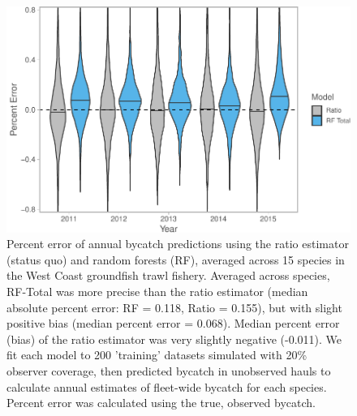\documentclass[]{article}
\begin{document}
\begin{figure}

{\centering \includegraphics[width=6in]{bycatch_sim_paper_sepsupp_ices_files/figure-latex/model-comparison-byyear-1} 

}

\caption{Percent error of annual bycatch predictions using the ratio estimator (status quo) and random forests (RF), averaged across 15 species in the West Coast groundfish trawl fishery. Averaged across species, RF-Total was more precise than the ratio estimator (median absolute percent error: RF = 0.118, Ratio = 0.155), but with slight positive bias (median percent error = 0.068). Median percent error (bias) of the ratio estimator was very slightly negative (-0.011). We fit each model to 200 'training' datasets simulated with 20\% observer coverage, then predicted bycatch in unobserved hauls to calculate annual estimates of fleet-wide bycatch for each species. Percent error was calculated using the true, observed bycatch.}\label{fig:model-comparison-byyear}
\end{figure}

\pagebreak
\end{document}
